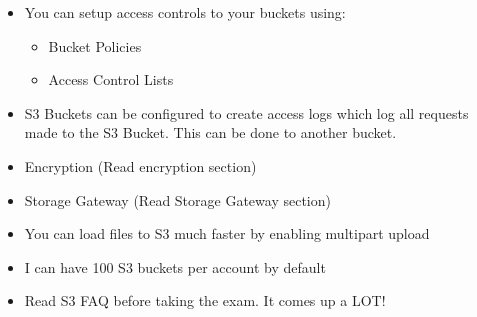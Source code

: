 \documentclass{article}
\begin{document}
\begin{itemize}
\item
You can setup access controls to your buckets using:
	\begin{itemize}
	\item
	Bucket Policies
	
	\item
	Access Control Lists
	\end{itemize}

\item
S3 Buckets can be configured to create access logs which log all requests made to the S3 Bucket. This can be done to another bucket.

\item
Encryption (Read encryption section)

\item
Storage Gateway (Read Storage Gateway section)

\item
You can load files to S3 much faster by enabling multipart upload

\item
I can have 100 S3 buckets per account by default

\item
Read S3 FAQ before taking the exam. It comes up a LOT!
\end{itemize}
\end{document}
